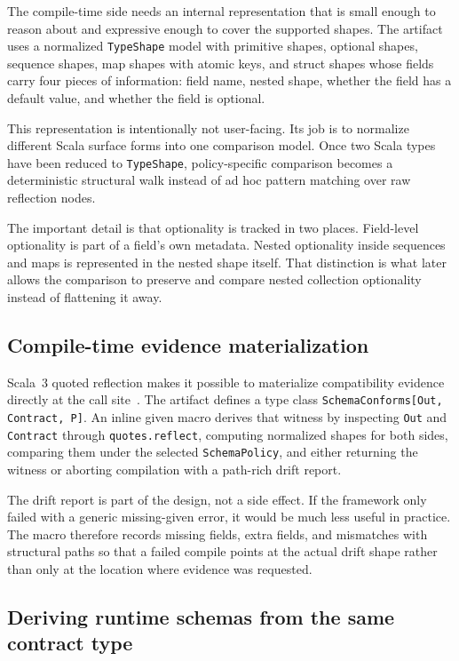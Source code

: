 The compile-time side needs an internal representation that is small enough to reason about and expressive enough to cover the supported shapes. The artifact uses a normalized \texttt{TypeShape} model with primitive shapes, optional shapes, sequence shapes, map shapes with atomic keys, and struct shapes whose fields carry four pieces of information: field name, nested shape, whether the field has a default value, and whether the field is optional.

This representation is intentionally not user-facing. Its job is to normalize different Scala surface forms into one comparison model. Once two Scala types have been reduced to \texttt{TypeShape}, policy-specific comparison becomes a deterministic structural walk instead of ad hoc pattern matching over raw reflection nodes.

The important detail is that optionality is tracked in two places. Field-level optionality is part of a field's own metadata. Nested optionality inside sequences and maps is represented in the nested shape itself. That distinction is what later allows the comparison to preserve and compare nested collection optionality instead of flattening it away.

\subsection{Compile-time evidence materialization}

Scala~3 quoted reflection makes it possible to materialize compatibility evidence directly at the call site~\cite{scala3_reflection}. The artifact defines a type class \texttt{SchemaConforms[Out, Contract, P]}. An inline given macro derives that witness by inspecting \texttt{Out} and \texttt{Contract} through \texttt{quotes.reflect}, computing normalized shapes for both sides, comparing them under the selected \texttt{SchemaPolicy}, and either returning the witness or aborting compilation with a path-rich drift report.

The drift report is part of the design, not a side effect. If the framework only failed with a generic missing-given error, it would be much less useful in practice. The macro therefore records missing fields, extra fields, and mismatches with structural paths so that a failed compile points at the actual drift shape rather than only at the location where evidence was requested.

\subsection{Deriving runtime schemas from the same contract type}

